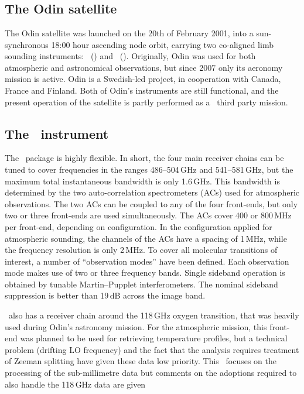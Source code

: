 \section{\smr}
\label{sec:smr}
%
\subsection{The Odin satellite}
\label{sec:odin}
%
The Odin satellite was launched on the 20th of February 2001, into a sun-synchronous
18:00 hour ascending node orbit, carrying two co-aligned limb sounding
instruments: \OSIRIS\ (\OSIRISlong) and
\SMR\ (\SMRlong). Originally, Odin was used for both
atmospheric and astronomical observations, but since 2007 only its aeronomy
mission is active. Odin is a Swedish-led project, in cooperation with Canada,
France and Finland. Both of Odin's instruments are still functional, and the
present operation of the satellite is partly performed as a \ESA\ third party
mission.


\subsection{The \SMR\ instrument}
\label{sec:smr:details}
%
The \smr\ package is highly flexible. In short, the four main receiver chains
can be tuned to cover frequencies in the ranges 486--504\,GHz and
541--581\,GHz, but the maximum total instantaneous bandwidth is only
1.6\,GHz. This bandwidth is determined by the two auto-correlation
spectrometers (ACs) used for atmospheric observations. The two ACs can be
coupled to any of the four front-ends, but only two or three front-ends are
used simultaneously. The ACs cover 400 or 800\,MHz per front-end, depending on
configuration. In the configuration applied for atmospheric sounding, the
channels of the ACs have a spacing of 1\,MHz, while the frequency resolution is
only 2\,MHz. To cover all molecular transitions
of interest, a number of ``observation modes'' have been defined. Each
observation mode makes use of two or three frequency bands. Single sideband
operation is obtained by tunable Martin--Pupplet interferometers. The nominal
sideband suppression is better than 19\,dB across the image band.

\smr\ also has a receiver chain around the 118\,GHz oxygen transition, that was
heavily used during Odin's astronomy mission. For the atmospheric mission, this
front-end was planned to be used for retrieving temperature profiles, but a
technical problem (drifting LO frequency) and the fact that the analysis
requires treatment of Zeeman splitting have given these data low priority. This
\ATBD\ focuses on the processing of the sub-millimetre data but comments on the
adoptions required to also handle the 118\,GHz data are given

